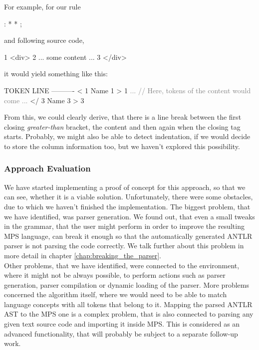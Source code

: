 \noindent
For example, for our  rule

\begin{antlr}
	  :   \literal{<}  * \literal{>} * \literal{</}  \literal{>} ;
\end{antlr}

\noindent
and following source code,

\begin{antlr}
	1   <div>
	2      ... some content ...
	3   </div>
\end{antlr}

\noindent
it would yield something like this:

\begin{antlr}
	TOKEN LINE
	----------
	<       1
	Name    1
	>       1
	\textcolor{gray}{...}
	\textcolor{gray}{// Here, tokens of the content would come}
	\textcolor{gray}{...}
	</      3
	Name    3
	>       3
\end{antlr}

From this, we could clearly derive, that there is a line break between the first closing \textit{greater-than} bracket, the content and then again when the closing tag starts.
Probably, we might also be able to detect indentation, if we would decide to store the column information too, but we haven't explored this possibility.

\subsubsection{Approach Evaluation}

We have started implementing a proof of concept for this approach, so that we can see, whether it is a viable solution.
Unfortunately, there were some obstacles, due to which we haven't finished the implementation.
The biggest problem, that we have identified, was parser generation.
We found out, that even a small tweaks in the grammar, that the user might perform in order to improve the resulting MPS language, can break it enough so that the automatically generated ANTLR parser is not parsing the code correctly.
We talk further about this problem in more detail in chapter \ref{chap:breaking_the_parser}.
\\

Other problems, that we have identified, were connected to the environment, where it might not be always possible, to perform actions such as parser generation, parser compilation or dynamic loading of the parser.
More problems concerned the algorithm itself, where we would need to be able to match language concepts with all tokens that belong to it.
Mapping the parsed ANTLR AST to the MPS one is a complex problem, that is also connected to parsing any given text source code and importing it inside MPS.
This is considered as an advanced functionality, that will probably be subject to a separate follow-up work.
\\

